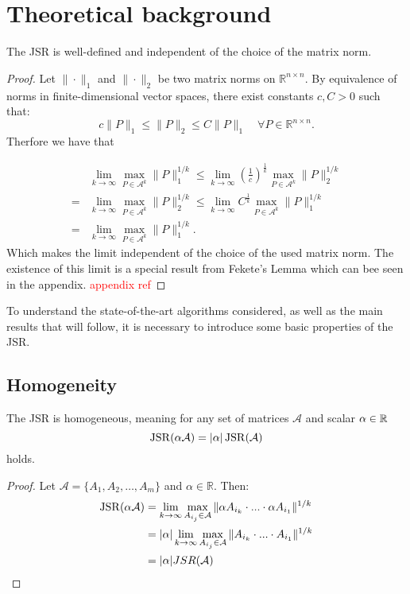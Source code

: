 \section{Theoretical background}

\begin{theorem}
    The JSR is well-defined and independent of the choice of the matrix norm.
\end{theorem}

\begin{proof}
Let $\| \cdot \|_1$   and $ \| \cdot \|_2 $ be two matrix norms on $ \mathbb{R}^{n \times n} $. By equivalence of norms in finite-dimensional vector spaces, there exist constants $ c, C > 0 $ such that:
$$
c \|P\|_1 \leq \|P\|_2 \leq C \|P\|_1 \quad \forall P \in \mathbb{R}^{n \times n}
.$$
Therfore we have that

\begin{align*}
& \lim_{k \to \infty} \max_{P \in \mathcal{A}^k} \|P\|_{1}^{1/k} 
\le  \lim_{k \to \infty} {(\frac{1}{c})}^{\frac{1}{k}} \max_{P \in \mathcal{A}^k} \|P\|_{2}^{1/k} \\
= & \lim_{k \to \infty} \max_{P \in \mathcal{A}^k} \|P\|_{2}^{1/k} 
\le  \lim_{k \to \infty} {C}^{\frac{1}{k}} \max_{P \in \mathcal{A}^k} \|P\|_{1}^{1/k}\\
= & \lim_{k \to \infty} \max_{P \in \mathcal{A}^k} \|P\|_{1}^{1/k}.
\end{align*}
Which makes the limit independent of the choice of the used matrix norm. 
The existence of this limit is a special result from Fekete's Lemma which can bee seen in the appendix. \textcolor{red}{appendix ref} 
\end{proof}

To understand the state-of-the-art algorithms considered, as well as the main results that will follow, it is necessary to introduce some basic properties of the JSR.

\subsection*{Homogeneity}
\begin{proposition}
    The JSR is homogeneous, meaning for any set of matrices $\mathcal{A}$ and scalar $\alpha \in \mathbb{R}$ 
    \begin{equation}
        \operatorname{JSR}(\alpha \mathcal{A}) = |\alpha| \operatorname{JSR}(\mathcal{A})
    \end{equation}
    holds.
\end{proposition}
\begin{proof}
    Let $\mathcal{A} = \{A_1, A_2, \dots, A_m\}$ and $\alpha \in \mathbb{R}$. Then:
    \begin{align*}
        \operatorname{JSR}(\alpha \mathcal{A}) & = \lim_{k \to \infty} \max_{A_{i_j} \in \mathcal{A}} \|\alpha A_{i_k} \cdot ... \cdot \alpha A_{i_1}\|^{1/k} \\
        & = |\alpha| \lim_{k \to \infty} \max_{A_{i_j} \in \mathcal{A}} \|A_{i_k} \cdot ... \cdot A_{i_1}\|^{1/k} \\
        & = |\alpha| JSR(\mathcal{A}) \\
    \end{align*}
\end{proof}

